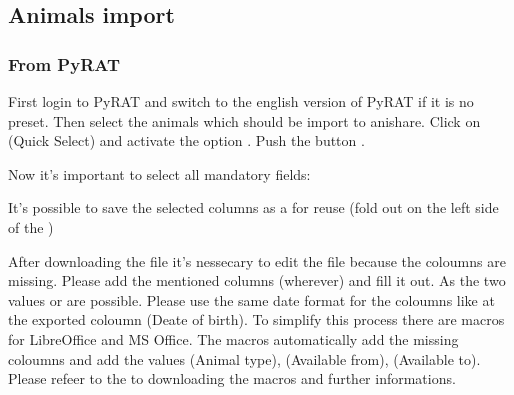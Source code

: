 \documentclass[letterpaper,10pt,openany,oneside,english]{sphinxmanual}
\begin{document}
\noindent{}


\subsection{Animals import}
\label{\detokenize{index:animals-import}}

\subsubsection{From PyRAT}
\label{\detokenize{index:from-pyrat}}
First login to PyRAT and switch to the english version of PyRAT if it is no preset. Then select the animals which
should be import to anishare. Click on  (Quick Select) and activate the option .
Push the button .

\noindent{}

Now it’s important to select all mandatory fields:

It’s possible to save the selected columns as a  for reuse (fold out  on the left side of the )

\noindent{}

After downloading the file it’s nessecary to edit the file because the coloumns  are missing.
Please add the mentioned columns (wherever) and fill it out. As  the two values  or  are possible.
Please use the same date format for the coloumns  like at the exported coloumn  (Deate of birth).
To simplify this process there are macros for LibreOffice and MS Office. The macros automatically add the missing coloumns and add the values
 (Animal type),  (Available from),  (Available to).
Please refeer to the  to downloading the macros and further informations.
\end{document}
